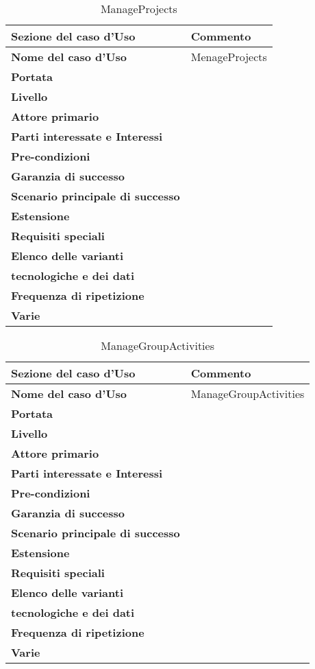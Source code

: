 \documentclass[12pt]{scrartcl}
\begin{document}
\begin{table}[h!]
  \caption{ManageProjects}
  \label{tab:table5}
  \begin{tabular}{|l|l|}
    \toprule
    \textbf{Sezione del caso d'Uso} & \textbf{Commento}\\
    \midrule
    \textbf{Nome del caso d'Uso} & MenageProjects\\
    \midrule
    \textbf{Portata} & \\
    \midrule
    \textbf{Livello} & \\
    \midrule
    \textbf{Attore primario} & \\
    \midrule
    \textbf{Parti interessate e Interessi} & \\
    \midrule
    \textbf{Pre-condizioni} & \\
    \midrule
    \textbf{Garanzia di successo} & \\
    \midrule
    \textbf{Scenario principale di successo} & \\
    \midrule
    \textbf{Estensione} & \\
    \midrule
    \textbf{Requisiti speciali} & \\
    \midrule
    \textbf{Elenco delle varianti}\\ \textbf{tecnologiche e dei dati} & \\
    \midrule
    \textbf{Frequenza di ripetizione} & \\
    \textbf{Varie} & \\
    \bottomrule
  \end{tabular}
\end{table}

\begin{table}[h!]
  \caption{ManageGroupActivities}
  \label{tab:table6}
  \begin{tabular}{|l|l|}
    \toprule
    \textbf{Sezione del caso d'Uso} & \textbf{Commento}\\
    \midrule
    \textbf{Nome del caso d'Uso} & ManageGroupActivities\\
    \midrule
    \textbf{Portata} & \\
    \midrule
    \textbf{Livello} & \\
    \midrule
    \textbf{Attore primario} & \\
    \midrule
    \textbf{Parti interessate e Interessi} & \\
    \midrule
    \textbf{Pre-condizioni} & \\
    \midrule
    \textbf{Garanzia di successo} & \\
    \midrule
    \textbf{Scenario principale di successo} & \\
    \midrule
    \textbf{Estensione} & \\
    \midrule
    \textbf{Requisiti speciali} & \\
    \midrule
    \textbf{Elenco delle varianti}\\ \textbf{tecnologiche e dei dati} & \\
    \midrule
    \textbf{Frequenza di ripetizione} & \\
    \textbf{Varie} & \\
    \bottomrule
  \end{tabular}
\end{table}
\end{document}
